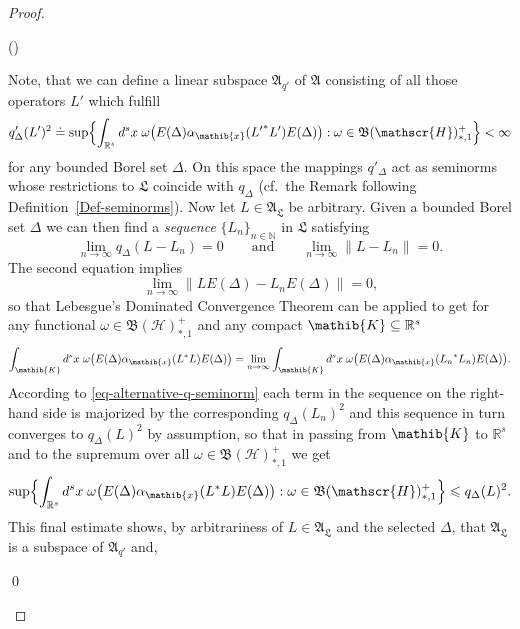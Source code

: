 \documentclass[11pt,twoside,openright]{report}
\theoremstyle{definition}
\theoremstyle{plain}
\theoremstyle{remark}
\theoremstyle{assumption}
\newcommand{\bset}[1]{\bigl\{ #1 \bigr\}}
\newcommand{\Bset}[1]{\Bigl\{ #1 \Bigr\}}
\newcommand{\norm}[1]{\lVert #1 \rVert}
\newcommand{\qD}{q_\Delta}
\newcommand{\qDx}[1]{q_\Delta ( #1 )}
\newcommand{\qprimeD}{q'_\Delta}
\newcommand{\qprimeDx}[1]{q'_\Delta ( #1 )}
\newcommand{\Nbb}{\mathbb{N}}
\newcommand{\Afrak}{\mathfrak{A}}
\newcommand{\Lfrak}{\mathfrak{L}}
\newcommand{\Kib}{\mathib{K}}
\newcommand{\Rs}{\mathbb{R}^s}
\newcommand{\AL}{\mathfrak{A}_\mathfrak{L}}
\newcommand{\BH}{\mathfrak{B} ( \mathscr{H} )}
\newcommand{\ED}{E ( \Delta )}
\newcommand{\aibx}{\alpha_\mathib{x}}
\newcounter{proofitem}
\newenvironment{prooflist}{\begin{list}{(\roman{proofitem})}%
  {\usecounter{proofitem} \setlength{\topsep}{0ex}%
   \setlength{\parsep}{0.2ex} \setlength{\itemsep}{0.4ex}%
   \setlength{\leftmargin}{0em} \setlength{\itemindent}{0.5em}%
   \setlength{\listparindent}{1em}}}{\qed \end{list}}
\begin{document}
\begin{proof}
  \begin{prooflist}
  \item Note, that we can define a linear subspace $\Afrak_{q'}$ of
    $\Afrak$ consisting of all those operators $L'$ which fulfill
    \begin{equation*}
      \qprimeDx{L'}^2 \doteq \sup \Bset{\int_{\Rs} d^s x \; \omega
      \bigl( \ED \aibx ( {L'}^* L' ) \ED \bigr) : \omega \in
      \BH^+_{*,1}} < \infty
    \end{equation*}
    for any bounded Borel set $\Delta$. On this space the mappings
    $\qprimeD$ act as seminorms whose restrictions to $\Lfrak$
    coincide with $\qD$ (cf.~the Remark following
    Definition~\ref{Def-seminorms}). Now let $L \in \AL$ be
    arbitrary. Given a bounded Borel set $\Delta$ we can then find a
    \emph{sequence} $\bset{L_n}_{n \in \Nbb}$ in $\Lfrak$ satisfying
    \begin{equation*}
      \lim_{n \rightarrow \infty} \qDx{L - L_n} = 0 \qquad \text{and}
      \qquad \lim_{n \rightarrow \infty} \norm{L - L_n} = 0 \text{.}
    \end{equation*}
    The second equation implies
    \begin{equation*}
      \lim_{n \rightarrow \infty} \norm{L \ED - L_n \ED} = 0 \text{,}
    \end{equation*}
    so that Lebesgue's Dominated Convergence Theorem can be applied to
    get for any functional $\omega \in \BH^+_{*,1}$ and any compact
    $\Kib \subseteq \Rs$
    \begin{equation*}
      \int_\Kib d^s x \; \omega \bigl( \ED \aibx ( L^* L ) \ED \bigr)
      = \lim _{n \rightarrow \infty} \int_\Kib d^s x \; \omega \bigl(
      \ED \aibx ( {L_n}^* L_n ) \ED \bigr) \text{.}
    \end{equation*}
    According to \eqref{eq-alternative-q-seminorm} each term in the
    sequence on the right-hand side is majorized by the corresponding
    $\qDx{L_n}^2$ and this sequence in turn converges to $\qDx{L}^2$
    by assumption, so that in passing from $\Kib$ to $\Rs$ and to the
    supremum over all $\omega \in \BH^+_{*,1}$ we get
    \begin{equation*}
      \sup \Bset{\int_{\Rs} d^s x \; \omega \bigl( \ED \aibx ( L^* L )
      \ED \bigr) : \omega \in \BH^+_{*,1}} \leqslant \qDx{L}^2
      \text{.}
    \end{equation*}
    This final estimate shows, by arbitrariness of $L \in \AL$ and the
    selected $\Delta$, that $\AL$ is a subspace of $\Afrak_{q'}$ and,

\end{prooflist}
\end{proof}
\end{document}
